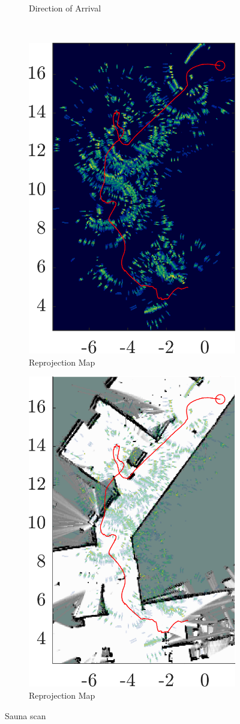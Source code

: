 \begin{figure}[htbp]
\begin{subfigure}[t]{0.32\linewidth}
        \caption{\small Direction of Arrival}
    \end{subfigure}\\
    \begin{subfigure}[t]{0.475\textwidth}   
        \centering 
        \includegraphics[max width=\linewidth, max height=\linewidth]{gfx/results/sauna_reprojection.png}
        \caption{\small Reprojection Map}
    \end{subfigure}%
    \hfill%
    \begin{subfigure}[t]{0.475\textwidth}   
        \centering 
        \includegraphics[max width=\linewidth, max height=\linewidth]{gfx/results/sauna_map.png}
        \caption{\small Reprojection Map}
    \end{subfigure}%
    \caption{Sauna scan}
\end{figure}

